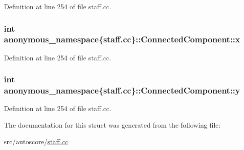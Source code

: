 Definition at line 254 of file staff.\+cc.

\subsubsection[{\texorpdfstring{x}{x}}]{\setlength{\rightskip}{0pt plus 5cm}int anonymous\+\_\+namespace\{staff.\+cc\}\+::Connected\+Component\+::x}\hypertarget{structanonymous__namespace_02staff_8cc_03_1_1ConnectedComponent_ad2ce06c074c1346400bc13dedc81db34}{}\label{structanonymous__namespace_02staff_8cc_03_1_1ConnectedComponent_ad2ce06c074c1346400bc13dedc81db34}


Definition at line 254 of file staff.\+cc.

\subsubsection[{\texorpdfstring{y}{y}}]{\setlength{\rightskip}{0pt plus 5cm}int anonymous\+\_\+namespace\{staff.\+cc\}\+::Connected\+Component\+::y}\hypertarget{structanonymous__namespace_02staff_8cc_03_1_1ConnectedComponent_a237de14dcb8f2dfba7f4a7d660eb64cf}{}\label{structanonymous__namespace_02staff_8cc_03_1_1ConnectedComponent_a237de14dcb8f2dfba7f4a7d660eb64cf}


Definition at line 254 of file staff.\+cc.



The documentation for this struct was generated from the following file\+:\begin{DoxyCompactItemize}
\item 
src/autoscore/\hyperlink{staff_8cc}{staff.\+cc}\end{DoxyCompactItemize}
